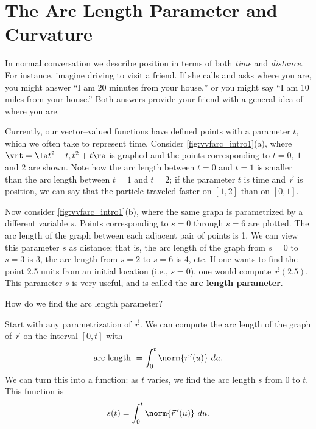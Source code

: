 \section{The Arc Length Parameter and Curvature}\label{sec:curvature}

In normal conversation we describe position in terms of both \emph{time} and \emph{distance}. For instance, imagine driving to visit a friend. If she calls and asks where you are, you might answer ``I am 20 minutes from your house,'' or you might say ``I am 10 miles from your house.'' Both answers provide your friend with a general idea of where you are.

Currently, our vector--valued functions have defined points with a parameter $t$, which we often take to represent time. Consider \autoref{fig:vvfarc_intro1}(a), where $\vrt = \la t^2-t,t^2+t\ra$ is graphed and the points corresponding to $t=0,\ 1$ and $2$ are shown. Note how the arc length between $t=0$ and $t=1$ is smaller than the arc length between $t=1$ and $t=2$; if the parameter $t$ is time and $\vec r$ is position, we can say that the particle traveled faster on $[1,2]$ than on $[0,1]$. 

Now consider \autoref{fig:vvfarc_intro1}(b), where the same graph is parametrized by a different variable $s$.  Points corresponding to $s=0$ through $s=6$ are plotted. The arc length of the graph between each adjacent pair of points is 1. We can view this parameter $s$ as distance; that is, the arc length of the graph from $s=0$ to $s=3$ is 3, the arc length from $s=2$ to $s=6$ is 4, etc. If one wants to find the point 2.5 units from an initial location (i.e., $s=0$), one would compute $\vec r(2.5)$. This parameter $s$ is very useful, and is called the \textbf{arc length parameter}.

How do we find the arc length parameter? 

Start with any parametrization of $\vec r$. We can compute the arc length of the graph of $\vec r$ on the interval $[0,t]$ with $$\text{arc length } = \int_0^t\norm{\vec r\,'(u)}\ du.$$ We can turn this into a function: as $t$ varies, we find the arc length $s$ from $0$ to $t$. This function is
\begin{equation}
s(t) = \int_0^t \norm{\vec r\,'(u)}\ du.\label{eq:vvfarc}
\end{equation}

